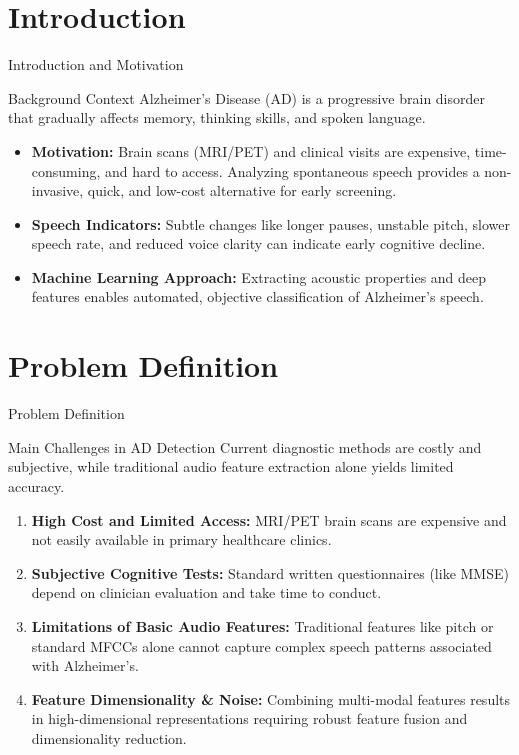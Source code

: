 \documentclass[aspectratio=169]{beamer}
\begin{document}
\section{Introduction}
\begin{frame}{Introduction and Motivation}
    \begin{block}{Background Context}
        Alzheimer's Disease (AD) is a progressive brain disorder that gradually affects memory, thinking skills, and spoken language.
    \end{block}
    \begin{itemize}
        \item \textbf{Motivation:} Brain scans (MRI/PET) and clinical visits are expensive, time-consuming, and hard to access. Analyzing spontaneous speech provides a non-invasive, quick, and low-cost alternative for early screening.
        \item \textbf{Speech Indicators:} Subtle changes like longer pauses, unstable pitch, slower speech rate, and reduced voice clarity can indicate early cognitive decline.
        \item \textbf{Machine Learning Approach:} Extracting acoustic properties and deep features enables automated, objective classification of Alzheimer's speech.
    \end{itemize}
\end{frame}

\section{Problem Definition}
\begin{frame}{Problem Definition}
    \begin{alertblock}{Main Challenges in AD Detection}
        Current diagnostic methods are costly and subjective, while traditional audio feature extraction alone yields limited accuracy.
    \end{alertblock}
    
    \begin{enumerate}
        \item \textbf{High Cost and Limited Access:} MRI/PET brain scans are expensive and not easily available in primary healthcare clinics.
        \item \textbf{Subjective Cognitive Tests:} Standard written questionnaires (like MMSE) depend on clinician evaluation and take time to conduct.
        \item \textbf{Limitations of Basic Audio Features:} Traditional features like pitch or standard MFCCs alone cannot capture complex speech patterns associated with Alzheimer's.
        \item \textbf{Feature Dimensionality \& Noise:} Combining multi-modal features results in high-dimensional representations requiring robust feature fusion and dimensionality reduction.
    \end{enumerate}
\end{frame}
\end{document}
